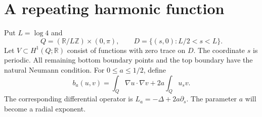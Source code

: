 \documentclass[11pt]{article}
\newcommand{\R}{\mathbb R}
\begin{document}
\section{A repeating harmonic function}\label{sec:mode}

Put \(L=\log4\) and
\[
 Q=(\R/L\mathbb Z)\times(0,\pi),\qquad
 D=\{(s,0):L/2<s<L\}.
\]
Let \(V\subset H^1(Q;\R)\) consist of functions with zero trace on \(D\).
The coordinate \(s\) is periodic. All remaining bottom boundary points and
the top boundary have the natural Neumann condition. For \(0\le a\le1/2\),
define
\begin{equation}\label{eq:form}
 b_a(u,v)=\int_Q\nabla u\cdot\nabla v+2a\int_Q u_s v .
\end{equation}
The corresponding differential operator is
\(L_a=-\Delta+2a\partial_s\). The parameter \(a\) will become a radial
exponent.
\end{document}
